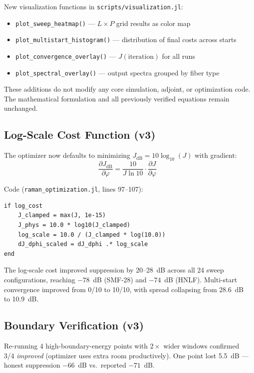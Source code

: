 \documentclass[12pt,a4paper]{article}
\newcommand{\pdv}[2]{\frac{\partial #1}{\partial #2}}
\theoremstyle{definition}
\begin{document}
New visualization functions in \texttt{scripts/visualization.jl}:
\begin{itemize}[leftmargin=*]
\item \texttt{plot\_sweep\_heatmap()} --- $L \times P$ grid results as color map
\item \texttt{plot\_multistart\_histogram()} --- distribution of final costs across starts
\item \texttt{plot\_convergence\_overlay()} --- $J(\text{iteration})$ for all runs
\item \texttt{plot\_spectral\_overlay()} --- output spectra grouped by fiber type
\end{itemize}

These additions do not modify any core simulation, adjoint, or optimization code. The mathematical formulation and all previously verified equations remain unchanged.

\subsection{Log-Scale Cost Function (v3)}

The optimizer now defaults to minimizing $J_{\text{dB}} = 10\log_{10}(J)$ with gradient:
\begin{equation}
\pdv{J_{\text{dB}}}{\varphi} = \frac{10}{J\ln 10}\cdot\pdv{J}{\varphi}
\end{equation}

Code (\texttt{raman\_optimization.jl}, lines 97--107):
\begin{lstlisting}
if log_cost
    J_clamped = max(J, 1e-15)
    J_phys = 10.0 * log10(J_clamped)
    log_scale = 10.0 / (J_clamped * log(10.0))
    dJ_dphi_scaled = dJ_dphi .* log_scale
end
\end{lstlisting}

\begin{keyresult}
The log-scale cost improved suppression by 20--28~dB across all 24 sweep configurations, reaching $-78$~dB (SMF-28) and $-74$~dB (HNLF). Multi-start convergence improved from 0/10 to 10/10, with spread collapsing from 28.6~dB to 10.9~dB.
\end{keyresult}

\subsection{Boundary Verification (v3)}

Re-running 4 high-boundary-energy points with $2\times$ wider windows confirmed 3/4 \emph{improved} (optimizer uses extra room productively). One point lost 5.5~dB --- honest suppression $-66$~dB vs.\ reported $-71$~dB.
\end{document}
